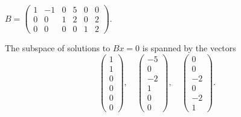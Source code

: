 \documentclass{ximera}
\begin{document}


\problemlabel

\begin{exercise} \label{c5.2.2d}
$B = \left(\begin{array}{rrrrrr} 1 & -1 & 0 & 5 & 0 & 0\\
        0 & 0 & 1 & 2 & 0 & 2\\
        0 & 0 & 0 & 0 & 1 & 2\end{array}\right)$.

\begin{solution}

\ans The subspace of solutions to $Bx = 0$ is spanned by the vectors
\[
\left(\begin{array}{r} 1 \\ 1 \\ 0 \\ 0 \\ 0 \\ 0 \end{array}\right), \quad
\left(\begin{array}{r} -5 \\ 0 \\ -2 \\ 1 \\ 0 \\ 0 \end{array}\right), \quad
\left(\begin{array}{r} 0 \\ 0 \\ -2 \\ 0 \\ -2 \\ 1 \end{array}\right).
\]


\end{solution}
\end{exercise}
\end{document}
